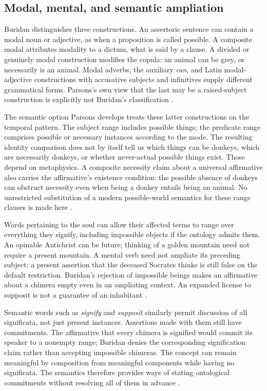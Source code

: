 \subsection{Modal, mental, and semantic ampliation}
\label{sec:p13-supposition-modal}

Buridan distinguishes three constructions. An assertoric sentence can
contain a modal noun or adjective, as when a proposition is called
possible. A composite modal attributes modality to a dictum, what is
said by a clause. A divided or genuinely modal construction modifies
the copula: an animal can be grey, or necessarily is an animal. Modal
adverbs, the auxiliary \emph{can}, and Latin modal-adjective constructions
with accusative subjects and infinitives supply different grammatical
forms. Parsons's own view that the last may be a raised-subject
construction is explicitly not Buridan's classification
\cite[pp.~211--213]{Parsons2007FordhamSupposition}.

The semantic option Parsons develops treats these latter constructions
on the temporal pattern. The subject range includes possible things;
the predicate range comprises possible or necessary instances according
to the mode. The resulting identity comparison does not by itself tell
us which things can be donkeys, which are necessarily donkeys, or whether
never-actual possible things exist. Those depend on metaphysics. A
composite necessity claim about a universal affirmative also carries
the affirmative's existence condition: the possible absence of donkeys
can obstruct necessity even when being a donkey entails being an animal.
No unrestricted substitution of a modern possible-world semantics for
these range clauses is made here
\cite[pp.~213--214]{Parsons2007FordhamSupposition}.

Words pertaining to the soul can allow their affected terms to range
over everything they signify, including impossible objects if the
ontology admits them. An opinable Antichrist can be future; thinking
of a golden mountain need not require a present mountain. A mental verb
need not ampliate its preceding subject: a present assertion that the
deceased Socrates thinks is still false on the default restriction.
Buridan's rejection of impossible beings makes an affirmative about a
chimera empty even in an ampliating context. An expanded license to
supposit is not a guarantee of an inhabitant
\cite[pp.~203--205,214]{Parsons2007FordhamSupposition}.

Semantic words such as \emph{signify} and \emph{supposit} similarly
permit discussion of all significata, not just present instances.
Assertions made with them still have commitments. The affirmative that
every chimera is signified would commit its speaker to a nonempty range;
Buridan denies the corresponding signification claim rather than
accepting impossible chimeras. The concept can remain meaningful by
composition from meaningful components while having no significata.
The semantics therefore provides ways of stating ontological commitments
without resolving all of them in advance
\cite[p.~215]{Parsons2007FordhamSupposition}.

